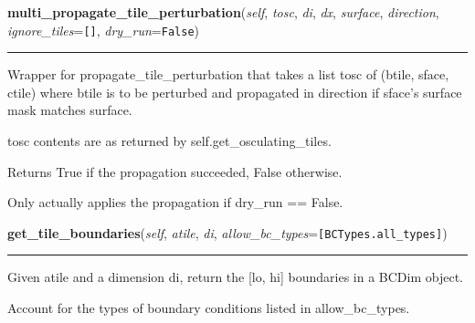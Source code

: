     \label{Tiling:Domain:multi_propagate_tile_perturbation}

    \vspace{0.5ex}

\hspace{.8\funcindent}\begin{boxedminipage}{\funcwidth}

    \raggedright \textbf{multi\_propagate\_tile\_perturbation}(\textit{self}, \textit{tosc}, \textit{di}, \textit{dx}, \textit{surface}, \textit{direction}, \textit{ignore\_tiles}={\tt []}, \textit{dry\_run}={\tt False})

    \vspace{-1.5ex}

    \rule{\textwidth}{0.5\fboxrule}
\setlength{\parskip}{2ex}
    Wrapper for propagate\_tile\_perturbation that takes a list tosc of 
    (btile, sface, ctile) where btile is to be perturbed and propagated in 
    direction if sface's surface mask matches surface.

    tosc contents are as returned by self.get\_osculating\_tiles.

    Returns True if the propagation succeeded, False otherwise.

    Only actually applies the propagation if dry\_run == False.

\setlength{\parskip}{1ex}
    \end{boxedminipage}

    \label{Tiling:Domain:get_tile_boundaries}

    \vspace{0.5ex}

\hspace{.8\funcindent}\begin{boxedminipage}{\funcwidth}

    \raggedright \textbf{get\_tile\_boundaries}(\textit{self}, \textit{atile}, \textit{di}, \textit{allow\_bc\_types}={\tt [BCTypes.all\_types]})

    \vspace{-1.5ex}

    \rule{\textwidth}{0.5\fboxrule}
\setlength{\parskip}{2ex}
    Given atile and a dimension di, return the [lo, hi] boundaries in a 
    BCDim object.

    Account for the types of boundary conditions listed in 
    allow\_bc\_types.

\setlength{\parskip}{1ex}
    \end{boxedminipage}

